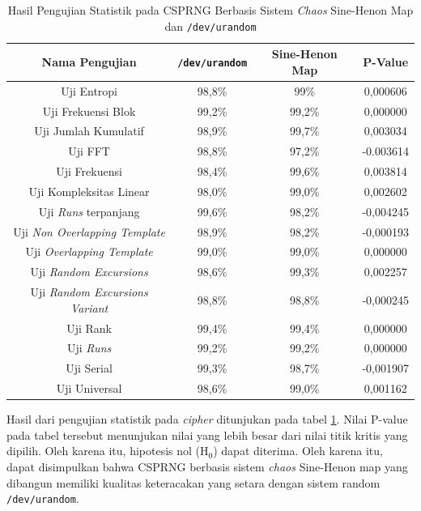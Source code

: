 \begin{table}[!h]
  \centering
  \caption{Hasil Pengujian Statistik pada CSPRNG Berbasis Sistem \emph{Chaos} Sine-Henon Map dan \texttt{/dev/urandom}} \label{tab:test.statistic.chaos}
  \begin{tabular}{|c|c|c|c|}
    \hline
    \textbf{Nama Pengujian }& \textbf{\texttt{/dev/urandom}} & \textbf{Sine-Henon Map} & \textbf{P-Value} \\ \hline
    Uji Entropi & 98,8\% & 99\% & 0,000606 \\ \hline
    Uji Frekuensi Blok & 99,2\% & 99,2\% & 0,000000 \\ \hline
    Uji Jumlah Kumulatif & 98,9\% & 99,7\% & 0,003034 \\ \hline
    Uji FFT & 98,8\% & 97,2\% & -0.003614 \\ \hline
    Uji Frekuensi & 98,4\% & 99,6\% & 0,003814 \\ \hline
    Uji Kompleksitas Linear & 98,0\% & 99,0\% & 0,002602 \\ \hline
    Uji \emph{Runs} terpanjang & 99,6\% & 98,2\% & -0,004245 \\ \hline
    Uji \emph{Non Overlapping Template} & 98,9\% & 98,2\% & -0,000193 \\ \hline
    Uji \emph{Overlapping Template} & 99,0\% & 99,0\% & 0,000000 \\ \hline
    Uji \emph{Random Excursions} & 98,6\% & 99,3\% & 0,002257 \\ \hline
    Uji \emph{Random Excursions Variant} & 98,8\% & 98,8\% & -0,000245 \\ \hline
    Uji Rank & 99,4\% & 99,4\% & 0,000000 \\ \hline
    Uji \emph{Runs} & 99,2\% & 99,2\% & 0,000000 \\ \hline
    Uji Serial & 99,3\% & 98,7\% & -0,001907 \\ \hline
    Uji Universal & 98,6\% & 99,0\% & 0,001162 \\ \hline
  \end{tabular}
\end{table}

Hasil dari pengujian statistik pada \emph{cipher} ditunjukan pada tabel \ref{tab:test.statistic.chaos}. Nilai P-value pada tabel tersebut menunjukan nilai yang lebih besar dari nilai titik kritis yang dipilih. Oleh karena itu, hipotesis nol ($\text{H}_0$) dapat diterima. Oleh karena itu, dapat disimpulkan bahwa CSPRNG berbasis sistem \emph{chaos} Sine-Henon map yang dibangun memiliki kualitas keteracakan yang setara dengan sistem random \texttt{/dev/urandom}.

